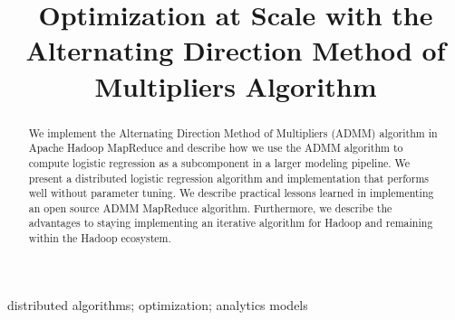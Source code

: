\documentclass[10pt, conference, compsocconf]{IEEEtran}
\begin{document}
%
\title{Optimization at Scale with the\\ Alternating Direction Method of Multipliers Algorithm}



\author{
}






\maketitle


\begin{abstract}
We implement the Alternating Direction Method of Multipliers (ADMM) algorithm in Apache Hadoop MapReduce and describe how we use the ADMM algorithm to compute logistic regression as a subcomponent in a larger modeling pipeline.  We present a distributed logistic regression algorithm and implementation that performs well without parameter tuning.  We describe practical lessons learned in implementing an open source ADMM MapReduce algorithm.  Furthermore, we describe the advantages to staying implementing an iterative algorithm for Hadoop and remaining within the Hadoop ecosystem.
\end{abstract}

\begin{IEEEkeywords}
distributed algorithms; optimization; analytics models
\end{IEEEkeywords}


%
\IEEEpeerreviewmaketitle
\end{document}
